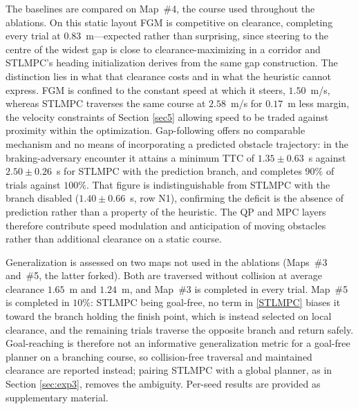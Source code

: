 \documentclass[journal]{IEEEtran}
\begin{document}
The baselines are compared on Map~\#4, the course used throughout the ablations. On this static layout FGM is competitive on clearance, completing every trial at $0.83$~m---expected rather than surprising, since steering to the centre of the widest gap is close to clearance-maximizing in a corridor and STLMPC's heading initialization derives from the same gap construction. The distinction lies in what that clearance costs and in what the heuristic cannot express. FGM is confined to the constant speed at which it steers, $1.50$~m/s, whereas STLMPC traverses the same course at $2.58$~m/s for $0.17$~m less margin, the velocity constraints of Section \ref{sec5} allowing speed to be traded against proximity within the optimization. Gap-following offers no comparable mechanism and no means of incorporating a predicted obstacle trajectory: in the braking-adversary encounter it attains a minimum TTC of $1.35\pm0.63$~s against $2.50\pm0.26$~s for STLMPC with the prediction branch, and completes $90\%$ of trials against $100\%$. That figure is indistinguishable from STLMPC with the branch disabled ($1.40\pm0.66$~s, row N1), confirming the deficit is the absence of prediction rather than a property of the heuristic. The QP and MPC layers therefore contribute speed modulation and anticipation of moving obstacles rather than additional clearance on a static course.

Generalization is assessed on two maps not used in the ablations (Maps~\#3 and~\#5, the latter forked). Both are traversed without collision at average clearance $1.65$~m and $1.24$~m, and Map~\#3 is completed in every trial. Map~\#5 is completed in $10\%$: STLMPC being goal-free, no term in \eqref{STLMPC} biases it toward the branch holding the finish point, which is instead selected on local clearance, and the remaining trials traverse the opposite branch and return safely. Goal-reaching is therefore not an informative generalization metric for a goal-free planner on a branching course, so collision-free traversal and maintained clearance are reported instead; pairing STLMPC with a global planner, as in Section \ref{sec:exp3}, removes the ambiguity. Per-seed results are provided as supplementary material.
\end{document}
